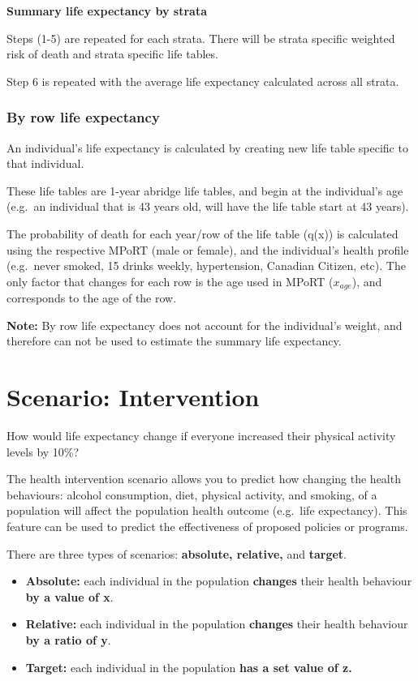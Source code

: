 \documentclass[]{book}
\providecommand{\tightlist}{%
  \setlength{\itemsep}{0pt}\setlength{\parskip}{0pt}}
\begin{document}
\textbf{Summary life expectancy by strata}

Steps (1-5) are repeated for each strata. There will be strata specific
weighted risk of death and strata specific life tables.

Step 6 is repeated with the average life expectancy calculated across
all strata.

\subsubsection{By row life expectancy}\label{by-row-life-expectancy}

An individual's life expectancy is calculated by creating new life table
specific to that individual.

These life tables are 1-year abridge life tables, and begin at the
individual's age (e.g.~an individual that is 43 years old, will have the
life table start at 43 years).

The probability of death for each year/row of the life table (q(x)) is
calculated using the respective MPoRT (male or female), and the
individual's health profile (e.g.~never smoked, 15 drinks weekly,
hypertension, Canadian Citizen, etc). The only factor that changes for
each row is the age used in MPoRT (\(x_{age}\)), and corresponds to the
age of the row.

\textbf{Note:} By row life expectancy does not account for the
individual's weight, and therefore can not be used to estimate the
summary life expectancy.

\section{Scenario: Intervention}\label{scenario-intervention}

How would life expectancy change if everyone increased their physical
activity levels by 10\%?

The health intervention scenario allows you to predict how changing the
health behaviours: alcohol consumption, diet, physical activity, and
smoking, of a population will affect the population health outcome
(e.g.~life expectancy). This feature can be used to predict the
effectiveness of proposed policies or programs.

There are three types of scenarios: \textbf{absolute, relative,} and
\textbf{target}.

\begin{itemize}
\tightlist
\item
  \textbf{Absolute:} each individual in the population \textbf{changes}
  their health behaviour \textbf{by a value of x}.
\item
  \textbf{Relative:} each individual in the population \textbf{changes}
  their health behaviour \textbf{by a ratio of y}.
\item
  \textbf{Target:} each individual in the population \textbf{has a set
  value of z.}
\end{itemize}
\end{document}
